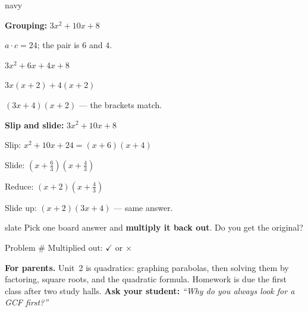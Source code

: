 \documentclass[12pt]{article}
\begin{document}
\vspace{0.06in}
\boxguard[12]
\begin{scenariobox}{navy}
\small
\begin{minipage}[t]{0.47\linewidth}\vspace{0pt}\raggedright
\textbf{Grouping:} $3x^2+10x+8$\par\vspace{1pt}
$a\cdot c=24$; the pair is $6$ and $4$.\par
$3x^2+6x+4x+8$\par
$3x(x+2)+4(x+2)$\par
$(3x+4)(x+2)$ --- the brackets match.
\end{minipage}\hfill
\begin{minipage}[t]{0.49\linewidth}\vspace{0pt}\raggedright
\textbf{Slip and slide:} $3x^2+10x+8$\par\vspace{1pt}
Slip: $x^2+10x+24=(x+6)(x+4)$\par
Slide: $\left(x+\frac{6}{3}\right)\left(x+\frac{4}{3}\right)$\par
Reduce: $(x+2)\left(x+\frac{4}{3}\right)$\par
Slide up: $(x+2)(3x+4)$ --- same answer.
\end{minipage}
\end{scenariobox}

\vspace{0.06in}
\boxguard[5]
\begin{scenariobox}{slate}
Pick one board answer and \textbf{multiply it back out}. Do you get the original?\par
\vspace{6pt}
Problem \# \blank{1.0cm} \qquad Multiplied out: \blank{6.2cm} \qquad $\checkmark$ \; or \; $\times$
\end{scenariobox}

\vspace{0.06in}
\begin{remindbox}
\textbf{For parents.} Unit~2 is quadratics: graphing parabolas, then solving them by factoring,
square roots, and the quadratic formula. Homework is due the first class after two study halls. \textbf{Ask your student:}
\emph{``Why do you always look for a GCF first?''}
\end{remindbox}
\end{document}
